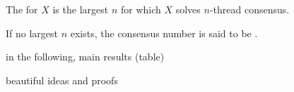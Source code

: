 \begin{frame}{}
  \begin{definition}
    The  for $X$ is the largest $n$ 
    for which $X$ solves $n$-thread consensus.

    \vspace{0.30cm}
    If no largest $n$ exists, the consensus number is said to be .
  \end{definition}
\end{frame}

\begin{frame}{}
  \begin{lemma}[$Y$ Implements $X$]
  \end{lemma}

  \vspace{0.50cm}
  \begin{theorem}
  \end{theorem}
\end{frame}

\begin{frame}{}
  in the following, main results (table)
\end{frame}

\begin{frame}{}
  beautiful ideas and proofs
\end{frame}
